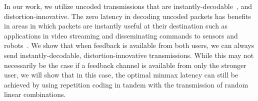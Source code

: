 In our work, we utilize uncoded transmissions that are instantly-decodable~\cite{SorourValaee15}, and distortion-innovative.  The zero latency in decoding uncoded packets has benefits in areas in which packets are instantly useful at their destination such as applications in video streaming and disseminating commands to sensors and robots~\cite{SorourValaee15,SorourValaee10}.  We show that when feedback is available from both users, we can always send instantly-decodable, distortion-innovative transmissions.  While this may not necessarily be the case if a feedback channel is available from only the stronger user, we will show that in this case, the optimal minmax latency can still be achieved by using repetition coding  in tandem with the transmission of random linear combinations. 

%
%


